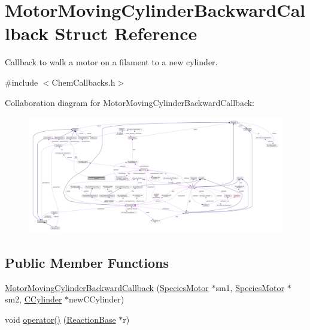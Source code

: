 \hypertarget{structMotorMovingCylinderBackwardCallback}{\section{Motor\+Moving\+Cylinder\+Backward\+Callback Struct Reference}
\label{structMotorMovingCylinderBackwardCallback}
}


Callback to walk a motor on a filament to a new cylinder.  




{\ttfamily \#include $<$Chem\+Callbacks.\+h$>$}



Collaboration diagram for Motor\+Moving\+Cylinder\+Backward\+Callback\+:\nopagebreak
\begin{figure}[H]
\begin{center}
\leavevmode
\includegraphics[width=350pt]{structMotorMovingCylinderBackwardCallback__coll__graph}
\end{center}
\end{figure}
\subsection*{Public Member Functions}
\begin{DoxyCompactItemize}
\item 
\hyperlink{structMotorMovingCylinderBackwardCallback_affc37b3fcfb9c4274784e42d6d74b31a}{Motor\+Moving\+Cylinder\+Backward\+Callback} (\hyperlink{classSpeciesMotor}{Species\+Motor} $\ast$sm1, \hyperlink{classSpeciesMotor}{Species\+Motor} $\ast$sm2, \hyperlink{classCCylinder}{C\+Cylinder} $\ast$new\+C\+Cylinder)
\item 
void \hyperlink{structMotorMovingCylinderBackwardCallback_ab157006ae9fc4b8ccf4a30ddbf042f6e}{operator()} (\hyperlink{classReactionBase}{Reaction\+Base} $\ast$r)
\end{DoxyCompactItemize}
